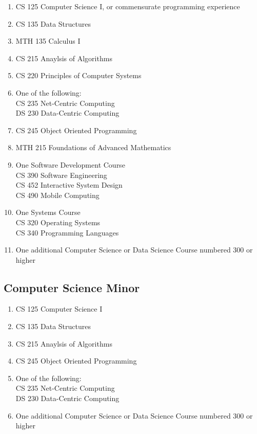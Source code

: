 \documentclass[
  letterpaper,
]{scrbook}
\providecommand{\tightlist}{%
  \setlength{\itemsep}{0pt}\setlength{\parskip}{0pt}}
\begin{document}
\begin{enumerate}
\def\labelenumi{\arabic{enumi}.}
\tightlist
\item
  CS 125 Computer Science I, or commensurate programming experience
\item
  CS 135 Data Structures
\item
  MTH 135 Calculus I
\item
  CS 215 Anaylsis of Algorithms
\item
  CS 220 Principles of Computer Systems
\item
  One of the following:\\
  CS 235 Net-Centric Computing\\
  DS 230 Data-Centric Computing\\
\item
  CS 245 Object Oriented Programming\\
\item
  MTH 215 Foundations of Advanced Mathematics\\
\item
  One Software Development Course\\
  CS 390 Software Engineering\\
  CS 452 Interactive System Design\\
  CS 490 Mobile Computing\\
\item
  One Systems Course\\
  CS 320 Operating Systems\\
  CS 340 Programming Languages\\
\item
  One additional Computer Science or Data Science Course numbered 300 or
  higher
\end{enumerate}

\subsection{Computer Science Minor}\label{computer-science-minor}

\begin{enumerate}
\def\labelenumi{\arabic{enumi}.}
\tightlist
\item
  CS 125 Computer Science I
\item
  CS 135 Data Structures
\item
  CS 215 Anaylsis of Algorithms
\item
  CS 245 Object Oriented Programming
\item
  One of the following:\\
  CS 235 Net-Centric Computing\\
  DS 230 Data-Centric Computing\\
\item
  One additional Computer Science or Data Science Course numbered 300 or
  higher
\end{enumerate}
\end{document}
